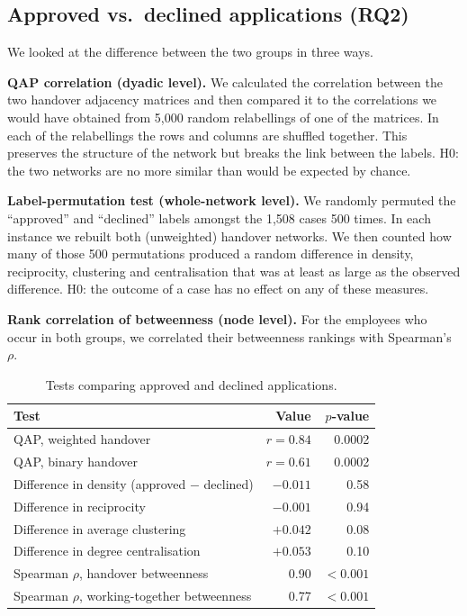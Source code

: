 \documentclass[12pt, a4paper]{article}
\begin{document}
\subsection{Approved vs.\ declined applications (RQ2)}

We looked at the difference between the two groups in three ways.

\textbf{QAP correlation (dyadic level).} We calculated the correlation between the two handover adjacency matrices and then compared it to the correlations we would have obtained from 5,000 random relabellings of one of the matrices. In each of the relabellings the rows and columns are shuffled together. This preserves the structure of the network but breaks the link between the labels. H0: the two networks are no more similar than would be expected by chance.

\textbf{Label-permutation test (whole-network level).} We randomly permuted the ``approved'' and ``declined'' labels amongst the 1,508 cases 500 times. In each instance we rebuilt both (unweighted) handover networks. We then counted how many of those 500 permutations produced a random difference in density, reciprocity, clustering and centralisation that was at least as large as the observed difference. H0: the outcome of a case has no effect on any of these measures.

\textbf{Rank correlation of betweenness (node level).} For the employees who occur in both groups, we correlated their betweenness rankings with Spearman's $\rho$.

\begin{table}[h]
\centering
\caption{Tests comparing approved and declined applications.}
\label{tab:tests}
\begin{tabular}{lrr}
\toprule
Test & Value & $p$-value \\
\midrule
QAP, weighted handover & $r = 0.84$ & 0.0002 \\
QAP, binary handover & $r = 0.61$ & 0.0002 \\
Difference in density (approved $-$ declined) & $-0.011$ & 0.58 \\
Difference in reciprocity & $-0.001$ & 0.94 \\
Difference in average clustering & $+0.042$ & 0.08 \\
Difference in degree centralisation & $+0.053$ & 0.10 \\
Spearman $\rho$, handover betweenness & 0.90 & $< 0.001$ \\
Spearman $\rho$, working-together betweenness & 0.77 & $< 0.001$ \\
\bottomrule
\end{tabular}
\end{table}
\end{document}
